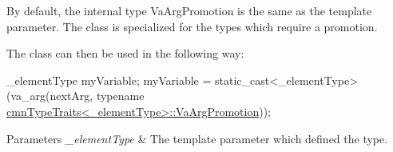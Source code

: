 By default, the internal type Va\-Arg\-Promotion is the same as the template parameter. The class is specialized for the types which require a promotion.

The class can then be used in the following way\-:


\begin{DoxyCode}
\_elementType myVariable;
myVariable = \textcolor{keyword}{static\_cast<}\_elementType\textcolor{keyword}{>}(va\_arg(nextArg, \textcolor{keyword}{typename} 
      \hyperlink{classcmn_type_traits_a824cf785b2d249f59bf5d9f03c6e8049}{cmnTypeTraits<\_elementType>::VaArgPromotion}));
\end{DoxyCode}



\begin{DoxyParams}{Parameters}
{\em \-\_\-element\-Type} & The template parameter which defined the type. \\
\hline
\end{DoxyParams}


